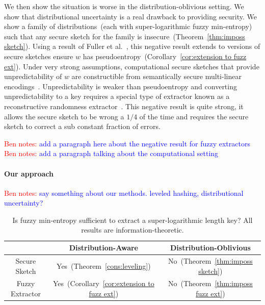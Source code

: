 \documentclass[11pt]{article}
\newcommand{\thref}[1]{\mbox{Theorem~\ref{#1}}}
\newcommand{\corref}[1]{\mbox{Corollary~\ref{#1}}}
\newcommand{\Hfuzz}{\mathrm{H}^{\mathtt{fuzz}}_{t,\infty}}
\newcommand{\authnote}[2]{{\textcolor{red}{\textsf{#1 notes: }\textcolor{blue}{ #2}}\marginpar{\textcolor{red}{\textbf{!!!!!}}}}}
\newcommand{\authnote}[2]{}
\newcommand{\bnote}[1]{{\authnote{Ben}{#1}}}
\begin{document}
We then show the situation is worse in the distribution-oblivious setting.  We show that distributional uncertainty is a real drawback to providing security.  We show a family of distributions~(each with super-logarithmic fuzzy min-entropy) such that any secure sketch for the family is insecure~(\thref{thm:imposs sketch}).  Using a result of Fuller et al.~\cite{fuller2013computational}, this negative result extends to versions of secure sketches ensure $w$ has  pseudoentropy~(\corref{cor:extension to fuzz ext}).  Under very strong assumptions, computational secure sketches that provide unpredictability of $w$ are constructible from semantically secure multi-linear encodings~\cite{BitanskyCKP14}.  Unpredictability is weaker than pseudoentropy and converting unpredictability to a key requires a special type of extractor known as a reconstructive randomness extractor~\cite{barak-computational, DBLP:conf/eurocrypt/HsiaoLR07}.  This negative result is quite strong, it allows the secure sketch to be wrong a $1/4$ of the time and requires the secure sketch to correct a sub constant fraction of errors.

\bnote{add a paragraph here about the negative result for fuzzy extractors}
\bnote{add a paragraph talking about the computational setting}

\paragraph{Our approach} \bnote{say something about our methods.  leveled hashing, distributional uncertainty?}
\begin{table}
\begin{center}
\begin{tabular}{c | c | c }
& Distribution-Aware & Distribution-Oblivious\\
\hline
Secure Sketch & Yes~(\thref{cons:leveling}) & No~(\thref{thm:imposs sketch})\\
\hline
Fuzzy Extractor & Yes~(\corref{cor:extension to fuzz ext}) & No~(\thref{thm:imposs fuzz ext})
\end{tabular}
\end{center}
\caption{Is fuzzy min-entropy sufficient to extract a super-logarithmic length key?  All results are information-theoretic.}
\label{tab:main results}
\end{table}
\end{document}
